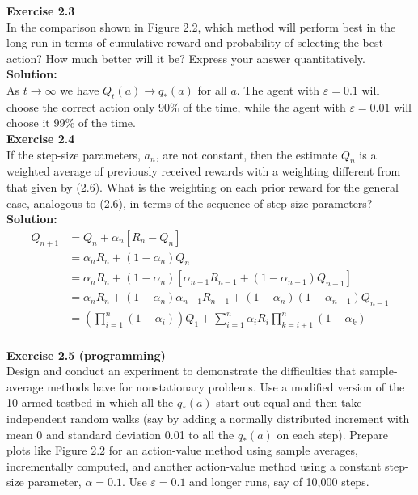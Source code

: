 \textbf{Exercise 2.3} \\
In the comparison shown in Figure 2.2, which method will perform best in
the long run in terms of cumulative reward and probability of selecting the best action?
How much better will it be? Express your answer quantitatively.\\

\textbf{Solution:}\\
As $t \to \infty$ we have $Q_t(a) \to q_*(a)$ for all $a$. The agent with $\varepsilon=0.1$ will choose the correct action only $90\%$ of the time, while the agent with $\varepsilon=0.01$ will choose it $99\%$ of the time.\\

\textbf{Exercise 2.4} \\
If the step-size parameters, $a_n$, are not constant, then the estimate $Q_n$ is
a weighted average of previously received rewards with a weighting different from that
given by (2.6). What is the weighting on each prior reward for the general case, analogous
to (2.6), in terms of the sequence of step-size parameters?\\

\textbf{Solution:}\\
\begin{equation}
    \begin{aligned}
        Q_{n+1} &= Q_n + \alpha_n \left[ R_n - Q_n \right] \\
        &= \alpha_n  R_n + (1-\alpha_n) Q_n \\
        &= \alpha_n  R_n + (1-\alpha_n) \left[ \alpha_{n-1}  R_{n-1} + (1-\alpha_{n-1}) Q_{n-1} \right] \\
        &= \alpha_n  R_n + (1-\alpha_n) \alpha_{n-1}  R_{n-1} + (1-\alpha_n) (1-\alpha_{n-1}) Q_{n-1} \\
        &= \left( \prod_{i=1}^{n} (1-\alpha_i) \right) Q_1 + \sum_{i=1}^{n} \alpha_i R_i \prod_{k=i+1}^{n} (1-\alpha_k) 
\end{aligned}
\end{equation}
\\

\textbf{Exercise 2.5 (programming)} \\
 Design and conduct an experiment to demonstrate the
difficulties that sample-average methods have for nonstationary problems. Use a modified
version of the 10-armed testbed in which all the $q_*(a)$ start out equal and then take
independent random walks (say by adding a normally distributed increment with mean 0
and standard deviation 0.01 to all the $q_*(a)$ on each step). Prepare plots like Figure 2.2
for an action-value method using sample averages, incrementally computed, and another
action-value method using a constant step-size parameter, $\alpha = 0.1$. Use $\varepsilon = 0.1$ and
longer runs, say of 10,000 steps. \\

